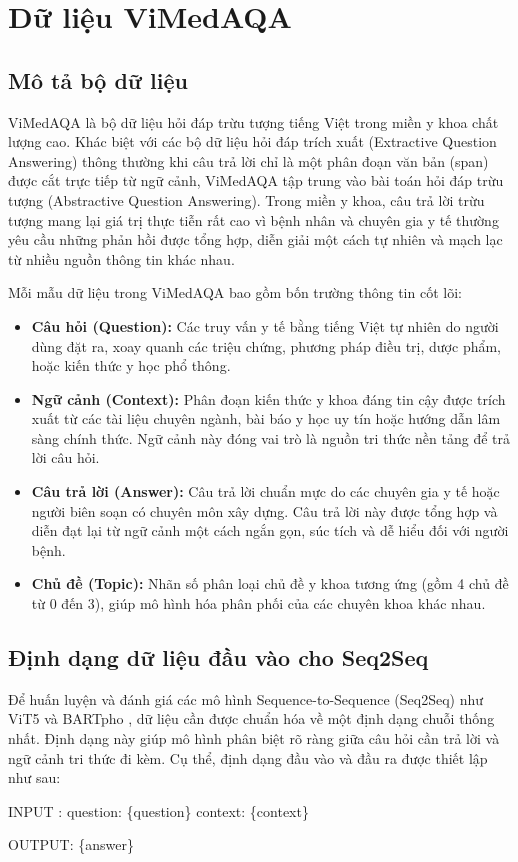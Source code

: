 \chapter{Dữ liệu ViMedAQA}
\section{Mô tả bộ dữ liệu}
ViMedAQA \cite{tran2024vimedaqa} là bộ dữ liệu hỏi đáp trừu tượng tiếng Việt trong miền y khoa chất lượng cao. Khác biệt với các bộ dữ liệu hỏi đáp trích xuất (Extractive Question Answering) thông thường khi câu trả lời chỉ là một phân đoạn văn bản (span) được cắt trực tiếp từ ngữ cảnh, ViMedAQA tập trung vào bài toán hỏi đáp trừu tượng (Abstractive Question Answering). Trong miền y khoa, câu trả lời trừu tượng mang lại giá trị thực tiễn rất cao vì bệnh nhân và chuyên gia y tế thường yêu cầu những phản hồi được tổng hợp, diễn giải một cách tự nhiên và mạch lạc từ nhiều nguồn thông tin khác nhau. 

Mỗi mẫu dữ liệu trong ViMedAQA bao gồm bốn trường thông tin cốt lõi:
\begin{itemize}
    \item \textbf{Câu hỏi (Question):} Các truy vấn y tế bằng tiếng Việt tự nhiên do người dùng đặt ra, xoay quanh các triệu chứng, phương pháp điều trị, dược phẩm, hoặc kiến thức y học phổ thông.
    \item \textbf{Ngữ cảnh (Context):} Phân đoạn kiến thức y khoa đáng tin cậy được trích xuất từ các tài liệu chuyên ngành, bài báo y học uy tín hoặc hướng dẫn lâm sàng chính thức. Ngữ cảnh này đóng vai trò là nguồn tri thức nền tảng để trả lời câu hỏi.
    \item \textbf{Câu trả lời (Answer):} Câu trả lời chuẩn mực do các chuyên gia y tế hoặc người biên soạn có chuyên môn xây dựng. Câu trả lời này được tổng hợp và diễn đạt lại từ ngữ cảnh một cách ngắn gọn, súc tích và dễ hiểu đối với người bệnh.
    \item \textbf{Chủ đề (Topic):} Nhãn số phân loại chủ đề y khoa tương ứng (gồm 4 chủ đề từ 0 đến 3), giúp mô hình hóa phân phối của các chuyên khoa khác nhau.
\end{itemize}

\section{Định dạng dữ liệu đầu vào cho Seq2Seq}
Để huấn luyện và đánh giá các mô hình Sequence-to-Sequence (Seq2Seq) như ViT5 \cite{phan2022vit5} và BARTpho \cite{tran2021bartpho}, dữ liệu cần được chuẩn hóa về một định dạng chuỗi thống nhất. Định dạng này giúp mô hình phân biệt rõ ràng giữa câu hỏi cần trả lời và ngữ cảnh tri thức đi kèm. Cụ thể, định dạng đầu vào và đầu ra được thiết lập như sau:
\begin{tcolorbox}[colback=codebg, colframe=myblue, title={Định dạng đầu vào/đầu ra thống nhất cho các mô hình Seq2Seq}]
\small\ttfamily
INPUT : question: \{question\} context: \{context\}\par
OUTPUT: \{answer\}
\end{tcolorbox}


